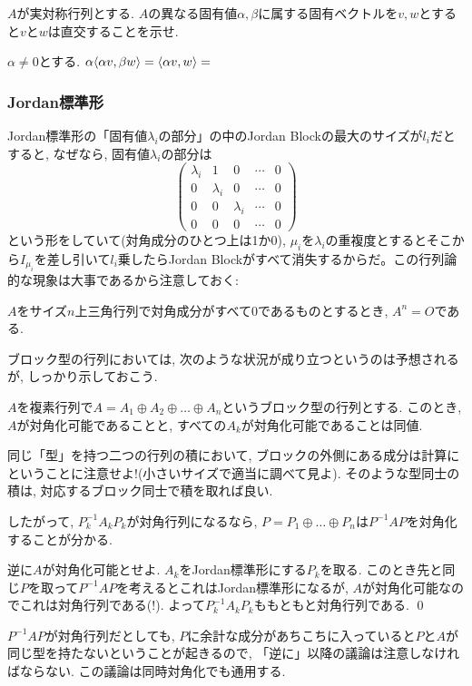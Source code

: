 \begin{egprob}
$A$が実対称行列とする. $A$の異なる固有値$\alpha,\beta$に属する固有ベクトルを$v,w$とすると$v$と$w$は直交することを示せ.
\end{egprob}
\begin{egans} $\alpha\neq 0$とする. $\alpha \langle \alpha v,\beta w\rangle  = \langle \alpha v, w\rangle = $
\end{egans}





\subsubsection{Jordan標準形}


Jordan標準形の「固有値$\lambda_i$の部分」の中のJordan Blockの最大のサイズが$l_i$だとすると, なぜなら, 固有値$\lambda_i$の部分は
\[
\begin{pmatrix}
\lambda_i &1 &0 &\cdots &0\\
0 & \lambda_i & 0 & \cdots  & 0\\
0 & 0 & \lambda_i & \cdots & 0\\
0 & 0& 0 & \cdots & 0
\end{pmatrix}
\]
という形をしていて(対角成分のひとつ上は1か0), $\mu_i$を$\lambda_i$の重複度とするとそこから$I_{\mu_i}$を差し引いて$l_i$乗したらJordan Blockがすべて消失するからだ。この行列論的な現象は大事であるから注意しておく:
\begin{prop}
$A$をサイズ$n$上三角行列で対角成分がすべて0であるものとするとき, $A^{n} = O$である.
\end{prop}

ブロック型の行列においては, 次のような状況が成り立つというのは予想されるが, しっかり示しておこう.
\begin{prop}
$A$を複素行列で$A=A_1\oplus A_2\oplus \dots \oplus A_n$というブロック型の行列とする. このとき, $A$が対角化可能であることと, すべての$A_k$が対角化可能であることは同値.
\end{prop}
\prf 同じ「型」を持つ二つの行列の積において, ブロックの外側にある成分は計算にということに注意せよ!(小さいサイズで適当に調べて見よ). そのような型同士の積は, 対応するブロック同士で積を取れば良い. \par
したがって, $P_k^{-1}A_k P_k$が対角行列になるなら, $P=P_1\oplus \dots \oplus P_n$は$P^{-1}AP$を対角化することが分かる. \par
逆に$A$が対角化可能とせよ. $A_k$をJordan標準形にする$P_k$を取る. このとき先と同じ$P$を取って$P^{-1}AP$を考えるとこれはJordan標準形になるが, $A$が対角化可能なのでこれは対角行列である(!). よって$P_k^{-1}A_kP_k$ももともと対角行列である. \qed
\begin{rem}
$P^{-1}AP$が対角行列だとしても, $P$に余計な成分があちこちに入っていると$P$と$A$が同じ型を持たないということが起きるので, 「逆に」以降の議論は注意しなければならない. この議論は同時対角化でも通用する.
\end{rem}


